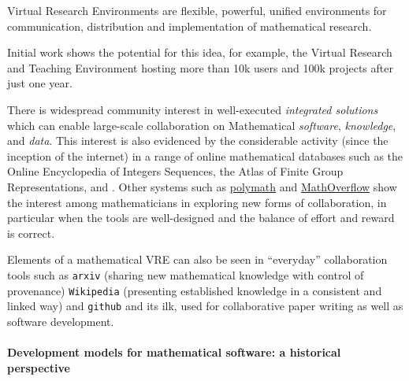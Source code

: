
Virtual Research Environments are flexible, powerful, unified
environments for communication, distribution and implementation of
mathematical research.

Initial work shows the potential for this idea, for example, the
Virtual Research and Teaching Environment \SMC hosting more than 10k
users and 100k projects after just one year.  

There is widespread community interest in well-executed
\emph{integrated solutions} which can enable large-scale collaboration
on Mathematical \emph{software}, \emph{knowledge}, and
\emph{data}. This interest is also evidenced by the considerable
activity (since the inception of the internet) in a range of online
mathematical databases such as the Online Encyclopedia of Integers
Sequences, the Atlas of Finite Group Representations, and \LMFDB.
%
Other systems such as \href{http://polymathprojects.org/}{polymath}
and \href{mathoverflow.net}{MathOverflow} show the interest among
mathematicians in exploring new forms of collaboration, in particular
when the tools are well-designed and the balance of effort and reward
is correct.

Elements of a mathematical VRE can also be seen in ``everyday''
collaboration tools such as \texttt{arxiv} (sharing new mathematical
knowledge with control of provenance) \texttt{Wikipedia} (presenting
established knowledge in a consistent and linked way) and
\texttt{github} and its ilk, used for collaborative paper writing as
well as software development.





\paragraph{Development models for mathematical software: a historical
  perspective}

